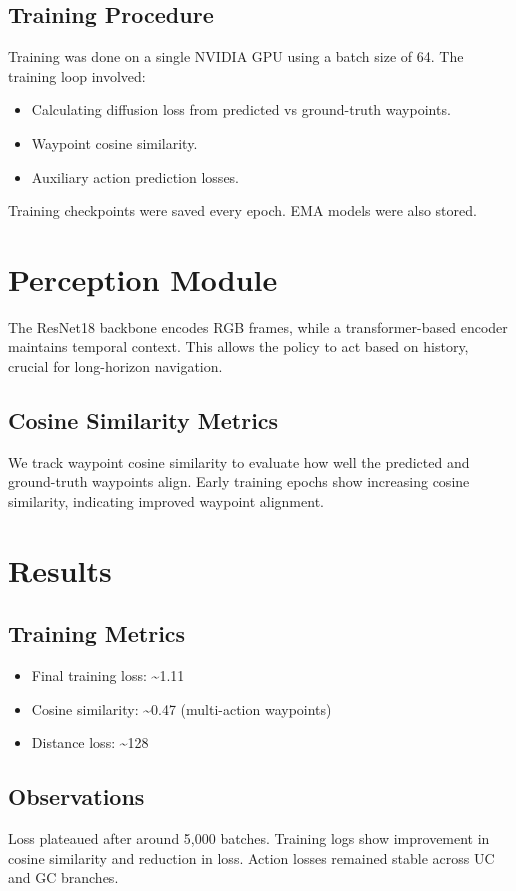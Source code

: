 \documentclass[12pt]{article}
\begin{document}
\subsection{Training Procedure}
Training was done on a single NVIDIA GPU using a batch size of 64. The training loop involved:
\begin{itemize}
\item Calculating diffusion loss from predicted vs ground-truth waypoints.
\item Waypoint cosine similarity.
\item Auxiliary action prediction losses.
\end{itemize}
Training checkpoints were saved every epoch. EMA models were also stored.

\section{Perception Module}
The ResNet18 backbone encodes RGB frames, while a transformer-based encoder maintains temporal context. This allows the policy to act based on history, crucial for long-horizon navigation.

\subsection{Cosine Similarity Metrics}
We track waypoint cosine similarity to evaluate how well the predicted and ground-truth waypoints align. Early training epochs show increasing cosine similarity, indicating improved waypoint alignment.

\section{Results}
\subsection{Training Metrics}
\begin{itemize}
\item Final training loss: \textasciitilde1.11
\item Cosine similarity: \textasciitilde0.47 (multi-action waypoints)
\item Distance loss: \textasciitilde128
\end{itemize}

\subsection{Observations}
Loss plateaued after around 5,000 batches. Training logs show improvement in cosine similarity and reduction in loss. Action losses remained stable across UC and GC branches.
\end{document}
